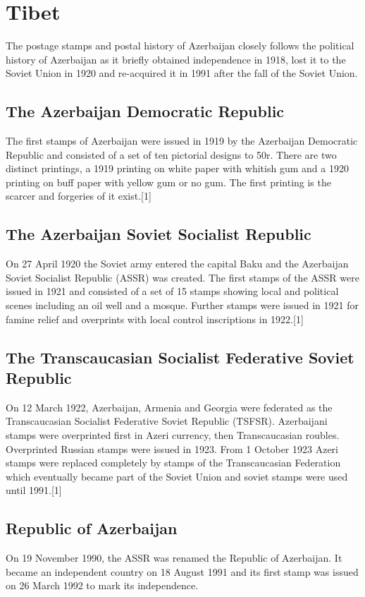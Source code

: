 
\section{Tibet}

The postage stamps and postal history of Azerbaijan closely follows the political history of Azerbaijan as it briefly obtained independence in 1918, lost it to the Soviet Union in 1920 and re-acquired it in 1991 after the fall of the Soviet Union.


\subsection{The Azerbaijan Democratic Republic}

The first stamps of Azerbaijan were issued in 1919 by the Azerbaijan Democratic Republic and consisted of a set of ten pictorial designs to 50r. There are two distinct printings, a 1919 printing on white paper with whitish gum and a 1920 printing on buff paper with yellow gum or no gum. The first printing is the scarcer and forgeries of it exist.[1]

\subsection{The Azerbaijan Soviet Socialist Republic}

On 27 April 1920 the Soviet army entered the capital Baku and the Azerbaijan Soviet Socialist Republic (ASSR) was created. The first stamps of the ASSR were issued in 1921 and consisted of a set of 15 stamps showing local and political scenes including an oil well and a mosque. Further stamps were issued in 1921 for famine relief and overprints with local control inscriptions in 1922.[1]

\subsection{The Transcaucasian Socialist Federative Soviet Republic}

On 12 March 1922, Azerbaijan, Armenia and Georgia were federated as the Transcaucasian Socialist Federative Soviet Republic (TSFSR). Azerbaijani stamps were overprinted first in Azeri currency, then Transcaucasian roubles. Overprinted Russian stamps were issued in 1923. From 1 October 1923 Azeri stamps were replaced completely by stamps of the Transcaucasian Federation which eventually became part of the Soviet Union and soviet stamps were used until 1991.[1]



\subsection{Republic of Azerbaijan}

On 19 November 1990, the ASSR was renamed the Republic of Azerbaijan. It became an independent country on 18 August 1991 and its first stamp was issued on 26 March 1992 to mark its independence.
  